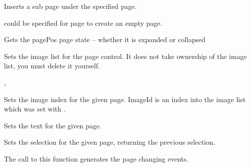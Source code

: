 Inserts a sub page under the specified page.

\NULL could be specified for page to create an empty page.


\label{wxtreebookisnodeexpanded}


Gets the pagePos page state -- whether it is expanded or collapsed



\label{wxtreebooksetimagelist}


Sets the image list for the page control. It does not take ownership of the image list, you must delete it yourself.


, 



\label{wxtreebooksetpageimage}


Sets the image index for the given page. ImageId is an index into the image list
which was set with .



\label{wxtreebooksetpagetext}


Sets the text for the given page.



\label{wxtreebooksetselection}


Sets the selection for the given page, returning the previous selection.

The call to this function generates the page changing events.



